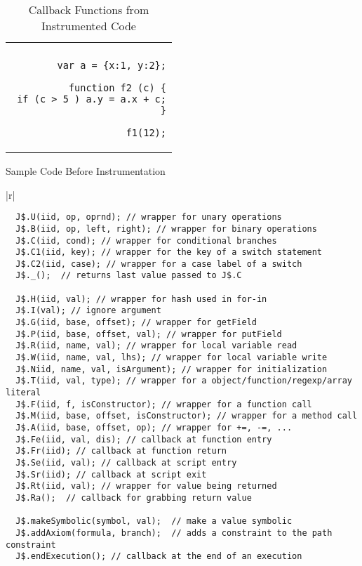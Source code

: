\documentclass{sig-alternate}
\begin{document}
\begin{table*}
\begin{minipage}{0.28\textwidth}
\begin{tabular}{|r|}
\hline\\
{\scriptsize
\begin{lstlisting}
var a = {x:1, y:2};

function f2 (c) {
 if (c > 5 ) a.y = a.x + c;
}

f1(12);
\end{lstlisting}
}\\
\hline
\end{tabular}
\caption{Sample Code Before Instrumentation}
\label{tab:original}
\end{minipage}
\begin{minipage}{0.71\textwidth}
\begin{tabular}{|r|}
\hline\\
{\scriptsize
\begin{lstlisting}
  J$.U(iid, op, oprnd); // wrapper for unary operations
  J$.B(iid, op, left, right); // wrapper for binary operations
  J$.C(iid, cond); // wrapper for conditional branches
  J$.C1(iid, key); // wrapper for the key of a switch statement
  J$.C2(iid, case); // wrapper for a case label of a switch
  J$._();  // returns last value passed to J$.C

  J$.H(iid, val); // wrapper for hash used in for-in
  J$.I(val); // ignore argument
  J$.G(iid, base, offset); // wrapper for getField
  J$.P(iid, base, offset, val); // wrapper for putField
  J$.R(iid, name, val); // wrapper for local variable read
  J$.W(iid, name, val, lhs); // wrapper for local variable write
  J$.Niid, name, val, isArgument); // wrapper for initialization
  J$.T(iid, val, type); // wrapper for a object/function/regexp/array literal
  J$.F(iid, f, isConstructor); // wrapper for a function call
  J$.M(iid, base, offset, isConstructor); // wrapper for a method call
  J$.A(iid, base, offset, op); // wrapper for +=, -=, ...
  J$.Fe(iid, val, dis); // callback at function entry
  J$.Fr(iid); // callback at function return
  J$.Se(iid, val); // callback at script entry
  J$.Sr(iid); // callback at script exit
  J$.Rt(iid, val); // wrapper for value being returned
  J$.Ra();  // callback for grabbing return value

  J$.makeSymbolic(symbol, val);  // make a value symbolic
  J$.addAxiom(formula, branch);  // adds a constraint to the path constraint
  J$.endExecution(); // callback at the end of an execution

\end{lstlisting}
}\\
\hline
\end{tabular}
\caption{Callback Functions from Instrumented Code}
\label{tab:callbacks}
\end{minipage}
\end{table*}
\end{document}
